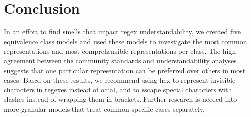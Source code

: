 
\section{Conclusion}
In an effort to find smells that impact regex understandability, we created five equivalence class models and used these models to investigate the most common representations and most comprehensible representations per class.  
 The high agreement between the community standards and understandability analyses  suggests that one particular representation can be preferred over others in most cases.  
Based on these results, we recommend using hex to represent invisible characters in regexes instead of octal, and to escape special characters with slashes instead of wrapping them in brackets.  
Further research is needed into more granular models that treat common specific cases separately.
